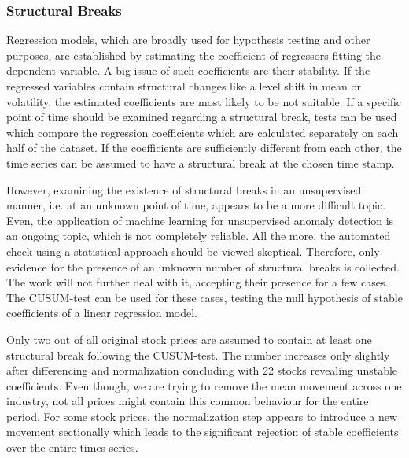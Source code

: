 

\subsubsection{Structural Breaks}
\label{subsubsection:structural_breaks}


Regression models, which are broadly used for hypothesis testing and other purposes, are established by estimating the coefficient of regressors fitting the dependent variable. A big issue of such coefficients are their stability. If the regressed variables contain structural changes like a level shift in mean or volatility, the estimated coefficients are most likely to be not suitable. If a specific point of time should be examined regarding a structural break, tests can be used which compare the regression coefficients which are calculated separately on each half of the dataset. If the coefficients are sufficiently different from each other, the time series can be assumed to have a structural break at the chosen time stamp.

However, examining the existence of structural breaks in an unsupervised manner, i.e. at an unknown point of time, appears to be a more difficult topic. Even, the application of machine learning for unsupervised anomaly detection is an ongoing topic, which is not completely reliable. All the more, the automated check using a statistical approach should be viewed skeptical. Therefore, only evidence for the presence of an unknown number of structural breaks is collected. The work will not further deal with it, accepting their presence for a few cases. The CUSUM-test \cite{Brown1975TechniquesTime} can be used for these cases, testing the null hypothesis of stable coefficients of a linear regression model.

Only two out of all original stock prices are assumed to contain at least one structural break following the CUSUM-test. The number increases only slightly after differencing and normalization concluding with 22 stocks revealing unstable coefficients. Even though, we are trying to remove the mean movement across one industry, not all prices might contain this common behaviour for the entire period. For some stock prices, the normalization step appears to introduce a new movement sectionally which leads to the significant rejection of stable coefficients over the entire times series.

